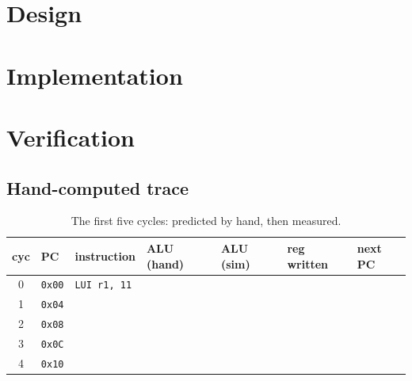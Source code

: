 \section{Design}

\section{Implementation}



\section{Verification}

\subsection*{Hand-computed trace}

\begin{table}[htbp]
\centering
\caption{The first five cycles: predicted by hand, then measured.}
\label{tab:lab12-hand}
\begin{tabular}{cllllll}
\toprule
cyc & PC & instruction & ALU (hand) & ALU (sim) & reg written & next PC \\
\midrule
0 & \texttt{0x00} & \texttt{LUI r1, 11} & & & & \\
1 & \texttt{0x04} & & & & & \\
2 & \texttt{0x08} & & & & & \\
3 & \texttt{0x0C} & & & & & \\
4 & \texttt{0x10} & & & & & \\
\bottomrule
\end{tabular}
\end{table}

